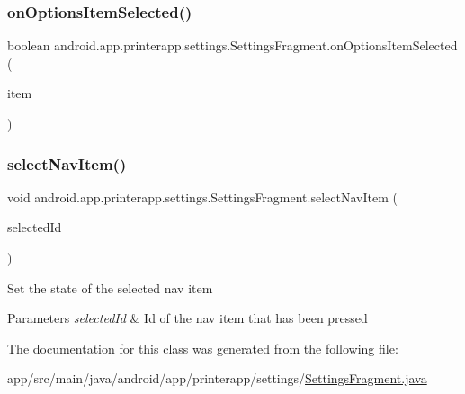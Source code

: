 \mbox{\label{classandroid_1_1app_1_1printerapp_1_1settings_1_1_settings_fragment_a5f621540c05e274987023276cb147a69}} 
\subsubsection{\texorpdfstring{on\+Options\+Item\+Selected()}{onOptionsItemSelected()}}
{\footnotesize\ttfamily boolean android.\+app.\+printerapp.\+settings.\+Settings\+Fragment.\+on\+Options\+Item\+Selected (\begin{DoxyParamCaption}\item[{android.\+view.\+Menu\+Item}]{item }\end{DoxyParamCaption})}

\mbox{\label{classandroid_1_1app_1_1printerapp_1_1settings_1_1_settings_fragment_a3723c14431936af528130daf3560b12b}} 
\subsubsection{\texorpdfstring{select\+Nav\+Item()}{selectNavItem()}}
{\footnotesize\ttfamily void android.\+app.\+printerapp.\+settings.\+Settings\+Fragment.\+select\+Nav\+Item (\begin{DoxyParamCaption}\item[{int}]{selected\+Id }\end{DoxyParamCaption})}

Set the state of the selected nav item


\begin{DoxyParams}{Parameters}
{\em selected\+Id} & Id of the nav item that has been pressed \\
\hline
\end{DoxyParams}


The documentation for this class was generated from the following file\+:\begin{DoxyCompactItemize}
\item 
app/src/main/java/android/app/printerapp/settings/\hyperlink{_settings_fragment_8java}{Settings\+Fragment.\+java}\end{DoxyCompactItemize}
